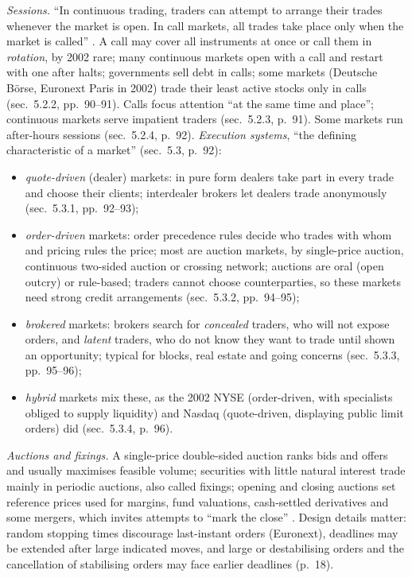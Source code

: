 \begin{qfdefinition}\label{def:trading-sessions-execution-systems}
 \emph{Sessions.} ``In continuous trading, traders can attempt to arrange their trades whenever the market is open. In call markets, all trades take place only when the market is called'' \citep[chap.~5, sec.~5.1, p.~89]{alpha-harris}. A call may cover all instruments at once or call them in \emph{rotation}, by 2002 rare; many continuous markets open with a call and restart with one after halts; governments sell debt in calls; some markets (Deutsche Börse, Euronext Paris in 2002) trade their least active stocks only in calls (sec.~5.2.2, pp.~90--91). Calls focus attention ``at the same time and place''; continuous markets serve impatient traders (sec.~5.2.3, p.~91). Some markets run after-hours sessions (sec.~5.2.4, p.~92). \emph{Execution systems}, ``the defining characteristic of a market'' (sec.~5.3, p.~92):
\begin{itemize}
\item \emph{quote-driven} (dealer) markets: in pure form dealers take part in every trade and choose their clients; interdealer brokers let dealers trade anonymously (sec.~5.3.1, pp.~92--93);
\item \emph{order-driven} markets: order precedence rules decide who trades with whom and pricing rules the price; most are auction markets, by single-price auction, continuous two-sided auction or crossing network; auctions are oral (open outcry) or rule-based; traders cannot choose counterparties, so these markets need strong credit arrangements (sec.~5.3.2, pp.~94--95);
\item \emph{brokered} markets: brokers search for \emph{concealed} traders, who will not expose orders, and \emph{latent} traders, who do not know they want to trade until shown an opportunity; typical for blocks, real estate and going concerns (sec.~5.3.3, pp.~95--96);
\item \emph{hybrid} markets mix these, as the 2002 NYSE (order-driven, with specialists obliged to supply liquidity) and Nasdaq (quote-driven, displaying public limit orders) did (sec.~5.3.4, p.~96).
\end{itemize}

 \emph{Auctions and fixings.} A single-price double-sided auction ranks bids and offers and usually maximises feasible volume; securities with little natural interest trade mainly in periodic auctions, also called fixings; opening and closing auctions set reference prices used for margins, fund valuations, cash-settled derivatives and some mergers, which invites attempts to ``mark the close'' \citep[chap.~2, sec.~2.4, pp.~17--18]{s6-hasbrouck}. Design details matter: random stopping times discourage last-instant orders (Euronext), deadlines may be extended after large indicated moves, and large or destabilising orders and the cancellation of stabilising orders may face earlier deadlines (p.~18).


\end{qfdefinition}
